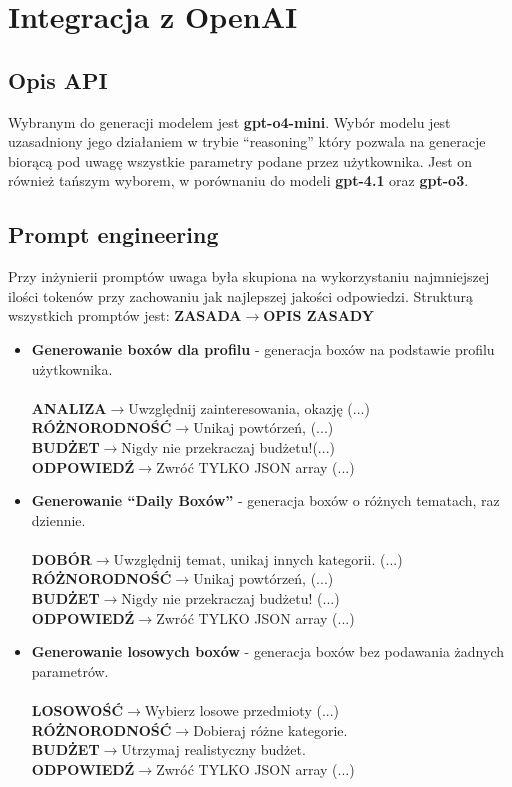 \documentclass[a4paper, 12pt]{article}
\begin{document}
\section{Integracja z OpenAI}
\subsection{Opis API}
Wybranym do generacji modelem jest \textbf{gpt-o4-mini}.
Wybór modelu jest uzasadniony
jego działaniem w trybie ``reasoning'' który pozwala na generacje biorącą pod
uwagę wszystkie parametry podane przez użytkownika.
Jest on również tańszym wyborem, w porównaniu do modeli \textbf{gpt-4.1} oraz \textbf{gpt-o3}.
\subsection{Prompt engineering}
Przy inżynierii promptów uwaga była skupiona na wykorzystaniu najmniejszej ilości tokenów
przy zachowaniu jak najlepszej jakości odpowiedzi.
Strukturą wszystkich promptów jest:
\textbf{ZASADA}$\rightarrow$\textbf{OPIS ZASADY}
\begin{itemize}
    \item \textbf{Generowanie boxów dla profilu} - generacja boxów na podstawie profilu użytkownika.\\\\
        \textbf{ANALIZA}$\rightarrow$Uwzględnij zainteresowania, okazję (...) \\
        \textbf{RÓŻNORODNOŚĆ}$\rightarrow$Unikaj powtórzeń, (...) \\
        \textbf{BUDŻET}$\rightarrow$Nigdy nie przekraczaj budżetu!(...) \\
        \textbf{ODPOWIEDŹ}$\rightarrow$Zwróć TYLKO JSON array (...) \\
    \item \textbf{Generowanie ``Daily Boxów''} - generacja boxów o różnych tematach, raz dziennie.\\\\
        \textbf{DOBÓR}$\rightarrow$Uwzględnij temat, unikaj innych kategorii. (...) \\
        \textbf{RÓŻNORODNOŚĆ}$\rightarrow$Unikaj powtórzeń,  (...) \\
        \textbf{BUDŻET}$\rightarrow$Nigdy nie przekraczaj budżetu!  (...) \\
        \textbf{ODPOWIEDŹ}$\rightarrow$Zwróć TYLKO JSON array  (...) \\
    \item \textbf{Generowanie losowych boxów} - generacja boxów bez podawania żadnych parametrów.\\\\
        \textbf{LOSOWOŚĆ}$\rightarrow$Wybierz losowe przedmioty (...) \\
        \textbf{RÓŻNORODNOŚĆ}$\rightarrow$Dobieraj różne kategorie. \\
        \textbf{BUDŻET}$\rightarrow$Utrzymaj realistyczny budżet.\\
        \textbf{ODPOWIEDŹ}$\rightarrow$Zwróć TYLKO JSON array (...) \\
\end{itemize}
\end{document}
